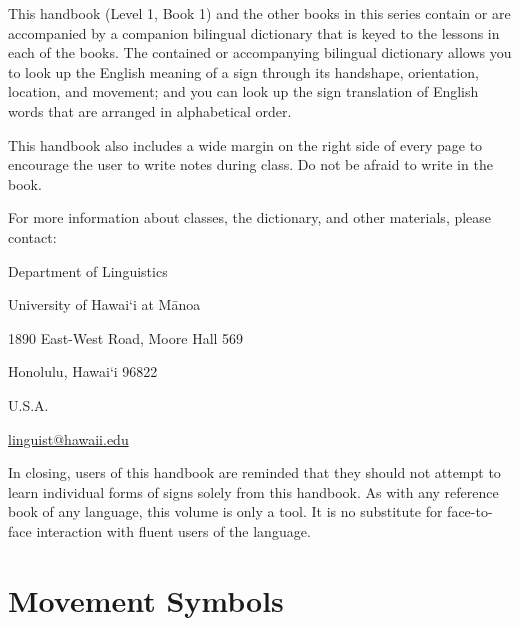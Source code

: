 \documentclass{tufte-book}
\begin{document}
This handbook (Level 1, Book 1) and the other books in this series contain or are accompanied by a companion bilingual dictionary that is keyed to the lessons in each of the books. The contained or accompanying bilingual dictionary allows you to look up the English meaning of a sign through its handshape, orientation, location, and movement; and you can look up the sign translation of English words that are arranged in alphabetical order.

This handbook also  includes a wide margin on the right side of every page to encourage the user to write notes during class. Do not be afraid to write in the book.



For more information about classes, the dictionary, and other materials, please contact:

\vspace{0.25cm}Department of Linguistics

University of Hawai`i at M\={a}noa

1890 East-West Road, Moore Hall 569

Honolulu, Hawai`i 96822

U.S.A.

\vspace{0.25cm}\href{mailto:linguist@hawaii.edu}{linguist@hawaii.edu}

\vspace{0.25cm}In closing, users of this handbook are reminded that they should not attempt to learn individual forms of signs solely from this handbook. As with any reference book of any language, this volume is only a tool. It is no substitute for face-to-face interaction with fluent users of the language.

\chapter{Movement Symbols}%
\end{document}
